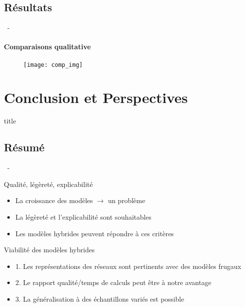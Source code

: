 \documentclass[aspectratio=169, 22pt]{beamer}
\begin{document}
\subsection{Résultats}
\begin{frame}{\secname~- \subsecname}
  \framesubtitle{Comparaisons qualitative}
  \begin{figure}
    \texttt{[image: comp\_img]}
  \end{figure}
\end{frame}

\section{Conclusion et Perspectives}
\begin{frame}
  \begin{beamercolorbox}[sep=15pt,center,shadow=true,rounded=true]{title}
    \LARGE\bfseries \secname
  \end{beamercolorbox}
\end{frame}

\subsection{Résumé}
\begin{frame}{\secname~- \subsecname}
  \begin{customblock}{Qualité, légèreté, explicabilité}
    \begin{itemize}
    \item La croissance des modèles $\rightarrow$ un problème
    \item La légèreté et l'explicabilité sont souhaitables
    \item Les modèles hybrides peuvent répondre à ces critères
    \end{itemize}
  \end{customblock}

  \pause
  \begin{exampleblock}{Viabilité des modèles hybrides}
    \begin{itemize}  
    \item 1. Les représentations des réseaux sont pertinents avec des modèles frugaux
    \item 2. Le rapport qualité/temps de calculs peut être à notre avantage
    \item 3. La généralisation à des échantillons variés est possible
    \end{itemize}
  \end{exampleblock}
\end{frame}
\end{document}
